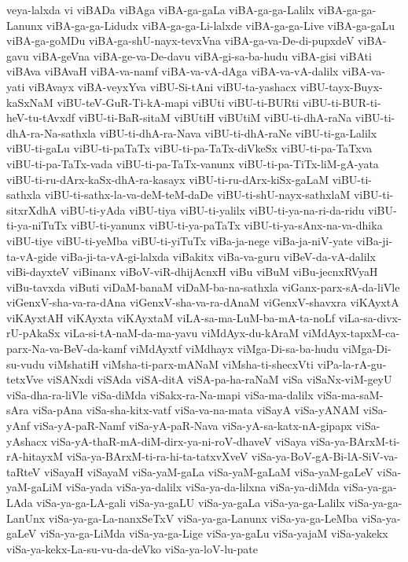 {veya-lalxda
vi
viBADa
viBAga
viBA-ga-gaLa
viBA-ga-ga-Lalilx
viBA-ga-ga-Lanunx
viBA-ga-ga-Lidudx
viBA-ga-ga-Li-lalxde
viBA-ga-ga-Live
viBA-ga-gaLu
viBA-ga-goMDu
viBA-ga-shU-nayx-tevxVna
viBA-ga-va-De-di-pupxdeV
viBA-gavu
viBA-geVna
viBA-ge-va-De-davu
viBA-gi-sa-ba-hudu
viBA-gisi
viBAti
viBAva
viBAvaH
viBA-va-namf
viBA-va-vA-dAga
viBA-va-vA-dalilx
viBA-va-yati
viBAvayx
viBA-veyxYva
viBU-Si-tAni
viBU-ta-yashacx
viBU-tayx-Buyx-kaSxNaM
viBU-teV-GuR-Ti-kA-mapi
viBUti
viBU-ti-BURti
viBU-ti-BUR-ti-heV-tu-tAvxdf
viBU-ti-BaR-sitaM
viBUtiH
viBUtiM
viBU-ti-dhA-raNa
viBU-ti-dhA-ra-Na-sathxla
viBU-ti-dhA-ra-Nava
viBU-ti-dhA-raNe
viBU-ti-ga-Lalilx
viBU-ti-gaLu
viBU-ti-paTaTx
viBU-ti-pa-TaTx-diVkeSx
viBU-ti-pa-TaTxva
viBU-ti-pa-TaTx-vada
viBU-ti-pa-TaTx-vanunx
viBU-ti-pa-TiTx-liM-gA-yata
viBU-ti-ru-dArx-kaSx-dhA-ra-kasayx
viBU-ti-ru-dArx-kiSx-gaLaM
viBU-ti-sathxla
viBU-ti-sathx-la-va-deM-teM-daDe
viBU-ti-shU-nayx-sathxlaM
viBU-ti-sitxrXdhA
viBU-ti-yAda
viBU-tiya
viBU-ti-yalilx
viBU-ti-ya-na-ri-da-ridu
viBU-ti-ya-niTuTx
viBU-ti-yanunx
viBU-ti-ya-paTaTx
viBU-ti-ya-sAnx-na-va-dhika
viBU-tiye
viBU-ti-yeMba
viBU-ti-yiTuTx
viBa-ja-nege
viBa-ja-niV-yate
viBa-ji-ta-vA-gide
viBa-ji-ta-vA-gi-lalxda
viBakitx
viBa-va-guru
viBeV-da-vA-dalilx
viBi-dayxteV
viBinanx
viBoV-viR-dhijAcnxH
viBu
viBuM
viBu-jecnxRVyaH
viBu-tavxda
viButi
viDaM-banaM
viDaM-ba-na-sathxla
viGanx-parx-sA-da-liVle
viGenxV-sha-va-ra-dAna
viGenxV-sha-va-ra-dAnaM
viGenxV-shavxra
viKAyxtA
viKAyxtAH
viKAyxta
viKAyxtaM
viLA-sa-ma-LuM-ba-mA-ta-noLf
viLa-sa-divx-rU-pAkaSx
viLa-si-tA-naM-da-ma-yavu
viMdAyx-du-kAraM
viMdAyx-tapxM-ca-parx-Na-va-BeV-da-kamf
viMdAyxtf
viMdhayx
viMga-Di-sa-ba-hudu
viMga-Di-su-vudu
viMshatiH
viMsha-ti-parx-mANaM
viMsha-ti-shecxVti
viPa-la-rA-gu-tetxVve
viSANxdi
viSAda
viSA-ditA
viSA-pa-ha-raNaM
viSa
viSaNx-viM-geyU
viSa-dha-ra-liVle
viSa-diMda
viSakx-ra-Na-mapi
viSa-ma-dalilx
viSa-ma-saM-sAra
viSa-pAna
viSa-sha-kitx-vatf
viSa-va-na-mata
viSayA
viSa-yANAM
viSa-yAnf
viSa-yA-paR-Namf
viSa-yA-paR-Nava
viSa-yA-sa-katx-nA-gipapx
viSa-yAshacx
viSa-yA-thaR-mA-diM-dirx-ya-ni-roV-dhaveV
viSaya
viSa-ya-BArxM-ti-rA-hitayxM
viSa-ya-BArxM-ti-ra-hi-ta-tatxvXveV
viSa-ya-BoV-gA-Bi-lA-SiV-va-taRteV
viSayaH
viSayaM
viSa-yaM-gaLa
viSa-yaM-gaLaM
viSa-yaM-gaLeV
viSa-yaM-gaLiM
viSa-yada
viSa-ya-dalilx
viSa-ya-da-lilxna
viSa-ya-diMda
viSa-ya-ga-LAda
viSa-ya-ga-LA-gali
viSa-ya-gaLU
viSa-ya-gaLa
viSa-ya-ga-Lalilx
viSa-ya-ga-LanUnx
viSa-ya-ga-La-nanxSeTxV
viSa-ya-ga-Lanunx
viSa-ya-ga-LeMba
viSa-ya-gaLeV
viSa-ya-ga-LiMda
viSa-ya-ga-Lige
viSa-ya-gaLu
viSa-yajaM
viSa-yakekx
viSa-ya-kekx-La-su-vu-da-deVko
viSa-ya-loV-lu-pate
}
